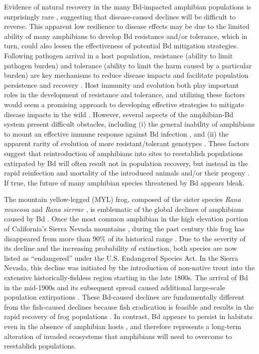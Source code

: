 \documentclass[
  letterpaper,
  DIV=11,
  numbers=noendperiod]{scrartcl}
\begin{document}
Evidence of natural recovery in the many Bd-impacted amphibian
populations is surprisingly rare \citep[for notable exceptions,
see][]{scheele2017, voyles2018, knapp2016}, suggesting that
disease-caused declines will be difficult to reverse. This apparent low
resilience to disease effects may be due to the limited ability of many
amphibians to develop Bd resistance and/or tolerance, which in turn,
could also lessen the effectiveness of potential Bd mitigation
strategies. Following pathogen arrival in a host population, resistance
(ability to limit pathogen burden) and tolerance (ability to limit the
harm caused by a particular burden) are key mechanisms to reduce disease
impacts \citep{raberg2009} and facilitate population persistence and
recovery \citep{brannelly2021}. Host immunity and evolution both play
important roles in the development of resistance and tolerance, and
utilizing these factors would seem a promising approach to developing
effective strategies to mitigate disease impacts in the wild
\citep{garner2016, woodhams2011}. However, several aspects of the
amphibian-Bd system present difficult obstacles, including (i) the
general inability of amphibians to mount an effective immune response
against Bd infection \citep{rosenblum2012, fites2013, grogan2018a}, and
(ii) the apparent rarity of evolution of more resistant/tolerant
genotypes \citep[but see][]{savage2016, grogan2018b}. These factors
suggest that reintroduction of amphibians into sites to reestablish
populations extirpated by Bd will often result not in population
recovery, but instead in the rapid reinfection and mortality of the
introduced animals and/or their progeny
\citep{hammond2021, knapp2022, stockwell2008, scheele2021}. If true, the
future of many amphibian species threatened by Bd appears bleak.

The mountain yellow-legged (MYL) frog, composed of the sister species
\emph{Rana muscosa} and \emph{Rana sierrae} \citep{vredenburg2007}, is
emblematic of the global declines of amphibians caused by Bd
\citep{scheele2019}. Once the most common amphibian in the high
elevation portion of California's Sierra Nevada mountains
\citep[USA,][]{grinnell1924}, during the past century this frog has
disappeared from more than 90\% of its historical range
\citep{vredenburg2007}. Due to the severity of its decline and the
increasing probability of extinction, both species are now listed as
``endangered'' under the U.S. Endangered Species Act. In the Sierra
Nevada, this decline was initiated by the introduction of non-native
trout into the extensive historically-fishless region
\citep{bradford1989, knapp2000} starting in the late 1800s. The arrival
of Bd in the mid-1900s and its subsequent spread \citep{vredenburg2019}
caused additional large-scale population extirpations
\citep{vredenburg2010, rachowicz2006}. These Bd-caused declines are
fundamentally different from the fish-caused declines because fish
eradication is feasible \citep{knapp1998} and results in the rapid
recovery of frog populations \citep{knapp2007, vredenburg2004}. In
contrast, Bd appears to persist in habitats even in the absence of
amphibian hosts \citep{walker2007}, and therefore represents a long-term
alteration of invaded ecosystems that amphibians will need to overcome
to reestablish populations.
\end{document}
